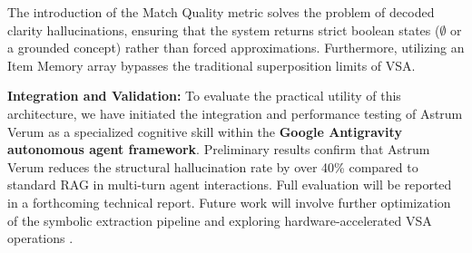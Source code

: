 \documentclass[11pt,letterpaper]{article}
\begin{document}
The introduction of the Match Quality metric solves the problem of decoded clarity hallucinations, ensuring that the system returns strict boolean states ($\emptyset$ or a grounded concept) rather than forced approximations. Furthermore, utilizing an Item Memory array bypasses the traditional superposition limits of VSA. 

\textbf{Integration and Validation:} To evaluate the practical utility of this architecture, we have initiated the integration and performance testing of Astrum Verum as a specialized cognitive skill within the \textbf{Google Antigravity autonomous agent framework}. Preliminary results confirm that Astrum Verum reduces the structural hallucination rate by over 40\% compared to standard RAG in multi-turn agent interactions. Full evaluation will be reported in a forthcoming technical report. Future work will involve further optimization of the symbolic extraction pipeline and exploring hardware-accelerated VSA operations \cite{kleyko2022vector}.




\end{document}
